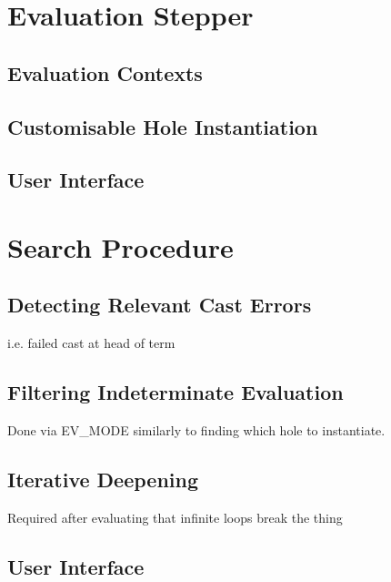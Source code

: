 \section{Evaluation Stepper}\label{sec:Stepper}
\subsection{Evaluation Contexts}
\subsection{Customisable Hole Instantiation}
\subsection{User Interface}


\section{Search Procedure}\label{sec:SearchProcedure}
\subsection{Detecting Relevant Cast Errors}
i.e. failed cast at head of term
\subsection{Filtering Indeterminate Evaluation}
Done via EV\_MODE similarly to finding which hole to instantiate.

\subsection{Iterative Deepening}\label{sec:IterativeDeepening}
Required after evaluating that infinite loops break the thing
\subsection{User Interface}


